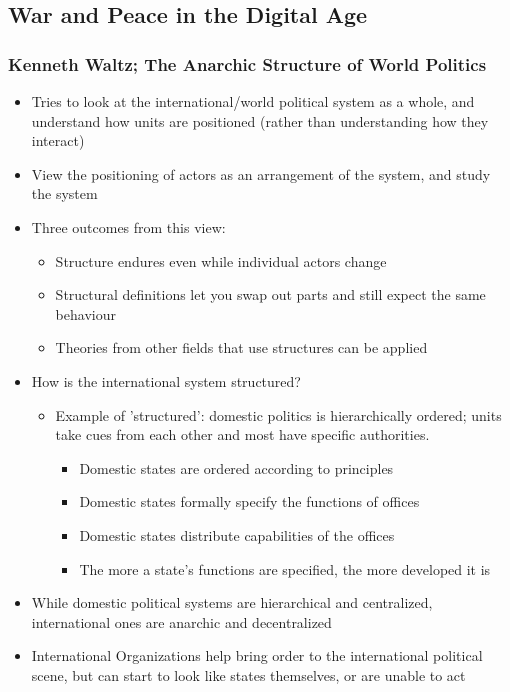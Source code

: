 \documentclass[11pt]{article}
\begin{document}
\subsection{War and Peace in the Digital Age}
\label{sec:org2131b7c}
\subsubsection{Kenneth Waltz; The Anarchic Structure of World Politics}
\label{sec:org01852e7}
\begin{itemize}
\item Tries to look at the international/world political system as a whole, and
understand how units are positioned (rather than understanding how they interact)
\item View the positioning of actors as an arrangement of the system, and study the system
\item Three outcomes from this view:
\begin{itemize}
\item Structure endures even while individual actors change
\item Structural definitions let you swap out parts and still expect the same behaviour
\item Theories from other fields that use structures can be applied
\end{itemize}
\item How is the international system structured?
\begin{itemize}
\item Example of 'structured': domestic politics is hierarchically ordered; units
take cues from each other and most have specific authorities.
\begin{itemize}
\item Domestic states are ordered according to principles
\item Domestic states formally specify the functions of offices
\item Domestic states distribute capabilities of the offices
\item The more a state's functions are specified, the more developed it is
\end{itemize}
\end{itemize}
\item While domestic political systems are hierarchical and centralized,
international ones are anarchic and decentralized
\item International Organizations help bring order to the international political
scene, but can start to look like states themselves, or are unable to act

\end{itemize}
\end{document}
